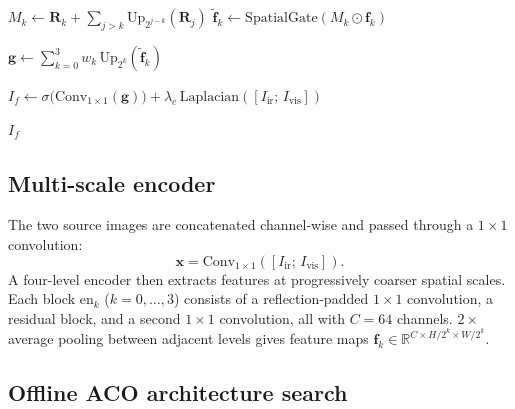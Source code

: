 \documentclass[a4paper,fleqn]{cas-dc}
\begin{document}
\begin{algorithm}[htbp]
\begin{algorithmic}[1]
  \State $M_k \leftarrow \mathbf{R}_k + \sum_{j>k}\mathrm{Up}_{2^{j-k}}(\mathbf{R}_j)$
  \State $\tilde{\mathbf{f}}_k \leftarrow
         \mathrm{SpatialGate}(M_k \odot \mathbf{f}_k)$
\EndFor

\State $\mathbf{g} \leftarrow
       \sum_{k=0}^{3} w_k\,\mathrm{Up}_{2^k}(\tilde{\mathbf{f}}_k)$

\State $I_f \leftarrow
       \sigma\!\bigl(\mathrm{Conv}_{1\times1}(\mathbf{g})\bigr)
       + \lambda_e\,\mathrm{Laplacian}([I_\mathrm{ir};\,I_\mathrm{vis}])$

\State \Return $I_f$

\end{algorithmic}
\end{algorithm}

\subsection{Multi-scale encoder}
\label{sec:method:encoder}

The two source images are concatenated channel-wise and passed through a
$1\times1$ convolution:
\begin{equation}
  \mathbf{x} = \mathrm{Conv}_{1\times1}([I_\mathrm{ir};\,I_\mathrm{vis}]).
  \label{eq:input}
\end{equation}
A four-level encoder then extracts features at progressively coarser spatial
scales.  Each block $\mathrm{en}_k$ ($k=0,\ldots,3$) consists of a
reflection-padded $1\times1$ convolution, a residual
block, and a second $1\times1$ convolution, all with $C=64$ channels.
$2\times$ average pooling between adjacent levels gives feature maps
$\mathbf{f}_k\!\in\!\mathbb{R}^{C\times H/2^k\times W/2^k}$.

\subsection{Offline ACO architecture search}
\label{sec:method:aco}
\end{document}
